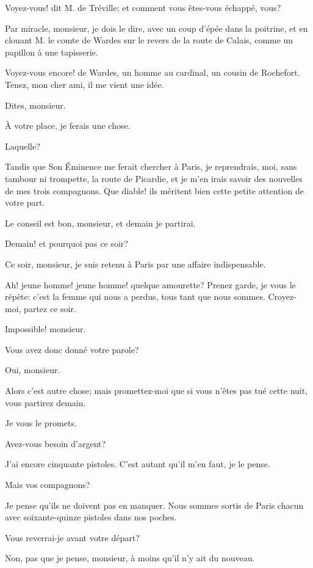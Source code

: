 \speak  Voyez-vous! dit M. de Tréville; et comment vous êtes-vous échappé, vous? 

\speak  Par miracle, monsieur, je dois le dire, avec un coup d'épée dans la poitrine, et en clouant M. le comte de Wardes sur le revers de la route de Calais, comme un papillon à une tapisserie. 

\speak  Voyez-vous encore! de Wardes, un homme au cardinal, un cousin de Rochefort. Tenez, mon cher ami, il me vient une idée. 

\speak  Dites, monsieur. 

\speak  À votre place, je ferais une chose. 

\speak  Laquelle? 

\speak  Tandis que Son Éminence me ferait chercher à Paris, je reprendrais, moi, sans tambour ni trompette, la route de Picardie, et je m'en irais savoir des nouvelles de mes trois compagnons. Que diable! ils méritent bien cette petite attention de votre part. 

\speak  Le conseil est bon, monsieur, et demain je partirai. 

\speak  Demain! et pourquoi pas ce soir? 

\speak  Ce soir, monsieur, je suis retenu à Paris par une affaire indispensable. 

\speak  Ah! jeune homme! jeune homme! quelque amourette? Prenez garde, je vous le répète: c'est la femme qui nous a perdus, tous tant que nous sommes. Croyez-moi, partez ce soir. 

\speak  Impossible! monsieur. 

\speak  Vous avez donc donné votre parole? 

\speak  Oui, monsieur. 

\speak  Alors c'est autre chose; mais promettez-moi que si vous n'êtes pas tué cette nuit, vous partirez demain. 

\speak  Je vous le promets. 

\speak  Avez-vous besoin d'argent? 

\speak  J'ai encore cinquante pistoles. C'est autant qu'il m'en faut, je le pense. 

\speak  Mais vos compagnons? 

\speak  Je pense qu'ils ne doivent pas en manquer. Nous sommes sortis de Paris chacun avec soixante-quinze pistoles dans nos poches. 

\speak  Vous reverrai-je avant votre départ? 

\speak  Non, pas que je pense, monsieur, à moins qu'il n'y ait du nouveau. 

